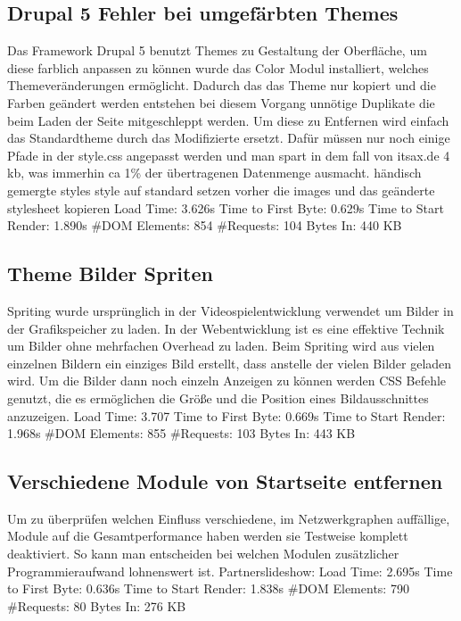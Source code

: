 \subsection{Drupal 5 Fehler bei umgefärbten Themes}
Das Framework Drupal 5 benutzt Themes zu Gestaltung der Oberfläche, um diese farblich anpassen zu können wurde das Color Modul installiert, welches Themeveränderungen ermöglicht. Dadurch das das Theme nur kopiert und die Farben geändert werden entstehen bei diesem Vorgang unnötige Duplikate die beim Laden der Seite mitgeschleppt werden. Um diese zu Entfernen wird einfach das Standardtheme durch das Modifizierte ersetzt. Dafür müssen  nur noch einige Pfade in der style.css angepasst werden und man spart in dem fall von itsax.de 4 kb, was immerhin ca 1\% der übertragenen Datenmenge ausmacht.
händisch gemergte styles
style auf standard setzen
vorher die images und das geänderte stylesheet kopieren
Load Time: 3.626s
Time to First Byte: 0.629s %
Time to Start Render: 1.890s
\#DOM Elements: 854 	
\#Requests: 104 %
Bytes In: 440 KB %

\subsection{Theme Bilder Spriten}
Spriting wurde ursprünglich in der Videospielentwicklung verwendet um Bilder in der Grafikspeicher zu laden. In der Webentwicklung ist es eine effektive Technik um Bilder ohne mehrfachen Overhead zu laden. Beim Spriting wird aus vielen einzelnen Bildern ein einziges Bild erstellt, dass anstelle der vielen Bilder geladen wird. Um die Bilder dann noch einzeln Anzeigen zu können werden CSS Befehle genutzt, die es ermöglichen die Größe und die Position eines Bildausschnittes anzuzeigen. 
Load Time: 3.707
Time to First Byte: 0.669s %
Time to Start Render: 1.968s
\#DOM Elements: 855 	
\#Requests: 103 
Bytes In: 443 KB 

\subsection{Verschiedene Module von Startseite entfernen}
Um zu überprüfen welchen Einfluss verschiedene, im Netzwerkgraphen auffällige, Module auf die Gesamtperformance haben werden sie Testweise komplett deaktiviert. So kann man entscheiden bei welchen Modulen zusätzlicher Programmieraufwand lohnenswert ist.
Partnerslideshow:
Load Time: 2.695s
Time to First Byte: 0.636s %
Time to Start Render: 1.838s
\#DOM Elements: 790 	
\#Requests: 80 
Bytes In: 276 KB

